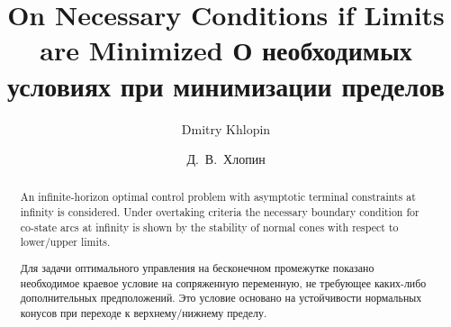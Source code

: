 \begin{englishtitle}
		\title{On Necessary Conditions  if  Limits are Minimized
		}
		\author{Dmitry Khlopin}
		
		\maketitle
		
		\begin{abstract}
	
	An infinite-horizon optimal control problem	with asymptotic terminal constraints at infinity is considered. Under overtaking criteria the necessary boundary condition for co-state arcs at infinity is shown by	the stability of normal cones with respect to lower/upper limits.

\end{abstract}
	\end{englishtitle}
	



\title{О необходимых условиях при минимизации пределов %
}
\author{Д.~В.~Хлопин
} %

\maketitle

\begin{abstract}
	   Для задачи оптимального управления на бесконечном промежутке  показано необходимое краевое условие на сопряженную переменную, не требующее каких-либо дополнительных предположений. Это условие основано на устойчивости  нормальных конусов при переходе к верхнему/нижнему пределу. 
	   
\end{abstract}



